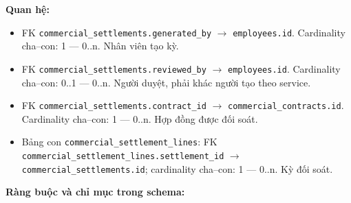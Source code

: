 \textbf{Quan hệ:}

\begin{itemize}

\item FK \texttt{commercial\_settlements.generated\_by} $\rightarrow$ \texttt{employees.id}. Cardinality cha--con: 1 — 0..n. Nhân viên tạo kỳ.

\item FK \texttt{commercial\_settlements.reviewed\_by} $\rightarrow$ \texttt{employees.id}. Cardinality cha--con: 0..1 — 0..n. Người duyệt, phải khác người tạo theo service.

\item FK \texttt{commercial\_settlements.contract\_id} $\rightarrow$ \texttt{commercial\_contracts.id}. Cardinality cha--con: 1 — 0..n. Hợp đồng được đối soát.

\item Bảng con \texttt{commercial\_settlement\_lines}: FK \texttt{commercial\_settlement\_lines.settlement\_id} $\rightarrow$ \texttt{commercial\_settlements.id}; cardinality cha--con: 1 — 0..n. Kỳ đối soát.

\end{itemize}

\textbf{Ràng buộc và chỉ mục trong schema:}

